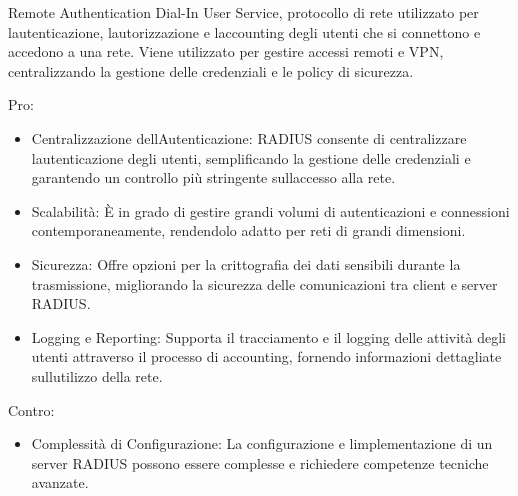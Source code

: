 \documentclass[
]{article}
\providecommand{\tightlist}{%
  \setlength{\itemsep}{0pt}\setlength{\parskip}{0pt}}
\begin{document}
{Remote Authentication Dial-In User Service, protocollo di rete
utilizzato per l\textquotesingle autenticazione,
l\textquotesingle autorizzazione e l\textquotesingle accounting degli
utenti che si connettono e accedono a una rete. Viene utilizzato per
gestire accessi remoti e VPN, centralizzando la gestione delle
credenziali e le policy di sicurezza.}

{}

{Pro}{: }

\begin{itemize}
\tightlist
\item
  {Centralizzazione dell\textquotesingle Autenticazione}{: RADIUS
  consente di centralizzare l\textquotesingle autenticazione degli
  utenti, semplificando la gestione delle credenziali e garantendo un
  controllo più stringente sull\textquotesingle accesso alla rete. }
\end{itemize}

{}

\begin{itemize}
\tightlist
\item
  {Scalabilità}{: È in grado di gestire grandi volumi di autenticazioni
  e connessioni contemporaneamente, rendendolo adatto per reti di grandi
  dimensioni. }
\end{itemize}

{}

\begin{itemize}
\tightlist
\item
  {Sicurezza}{: Offre opzioni per la crittografia dei dati sensibili
  durante la trasmissione, migliorando la sicurezza delle comunicazioni
  tra client e server RADIUS. }
\end{itemize}

{}

\begin{itemize}
\tightlist
\item
  {Logging e Reporting}{: Supporta il tracciamento e il logging delle
  attività degli utenti attraverso il processo di accounting, fornendo
  informazioni dettagliate sull\textquotesingle utilizzo della rete. }
\end{itemize}

{}

{Contro}{: }

\begin{itemize}
\tightlist
\item
  {Complessità di Configurazione}{: La configurazione e
  l\textquotesingle implementazione di un server RADIUS possono essere
  complesse e richiedere competenze tecniche avanzate. }
\end{itemize}
\end{document}
